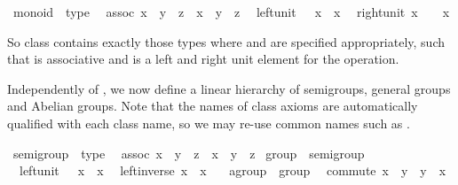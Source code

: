 \begin{isabellebody}
\begin{isamarkuptext}
\end{isamarkuptext}%
\isamarkuptrue%
\isamarkupfalse%
\ monoid\ {\isasymsubseteq}\ type\isanewline
\ \ assoc{\isacharcolon}\ {\isachardoublequoteopen}{\isacharparenleft}x\ {\isasymodot}\ y{\isacharparenright}\ {\isasymodot}\ z\ {\isacharequal}\ x\ {\isasymodot}\ {\isacharparenleft}y\ {\isasymodot}\ z{\isacharparenright}{\isachardoublequoteclose}\isanewline
\ \ left{\isacharunderscore}unit{\isacharcolon}\ {\isachardoublequoteopen}{\isasymone}\ {\isasymodot}\ x\ {\isacharequal}\ x{\isachardoublequoteclose}\isanewline
\ \ right{\isacharunderscore}unit{\isacharcolon}\ {\isachardoublequoteopen}x\ {\isasymodot}\ {\isasymone}\ {\isacharequal}\ x{\isachardoublequoteclose}%
\begin{isamarkuptext}%
\noindent So class  contains exactly those types
  \isa{{\isasymtau}} where \isa{{\isasymodot}\ {\isasymColon}\ {\isasymtau}\ {\isasymRightarrow}\ {\isasymtau}\ {\isasymRightarrow}\ {\isasymtau}} and \isa{{\isasymone}\ {\isasymColon}\ {\isasymtau}}
  are specified appropriately, such that \isa{{\isasymodot}} is associative and
  \isa{{\isasymone}} is a left and right unit element for the \isa{{\isasymodot}}
  operation.%
\end{isamarkuptext}%
\isamarkuptrue%
%
\begin{isamarkuptext}%
\medskip Independently of , we now define a linear
  hierarchy of semigroups, general groups and Abelian groups.  Note
  that the names of class axioms are automatically qualified with each
  class name, so we may re-use common names such as .%
\end{isamarkuptext}%
\isamarkuptrue%
\isamarkupfalse%
\ semigroup\ {\isasymsubseteq}\ type\isanewline
\ \ assoc{\isacharcolon}\ {\isachardoublequoteopen}{\isacharparenleft}x\ {\isasymodot}\ y{\isacharparenright}\ {\isasymodot}\ z\ {\isacharequal}\ x\ {\isasymodot}\ {\isacharparenleft}y\ {\isasymodot}\ z{\isacharparenright}{\isachardoublequoteclose}\isanewline
\isanewline
{}\isamarkupfalse%
\ group\ {\isasymsubseteq}\ semigroup\isanewline
\ \ left{\isacharunderscore}unit{\isacharcolon}\ {\isachardoublequoteopen}{\isasymone}\ {\isasymodot}\ x\ {\isacharequal}\ x{\isachardoublequoteclose}\isanewline
\ \ left{\isacharunderscore}inverse{\isacharcolon}\ {\isachardoublequoteopen}x{\isasyminv}\ {\isasymodot}\ x\ {\isacharequal}\ {\isasymone}{\isachardoublequoteclose}\isanewline
\isanewline
{}\isamarkupfalse%
\ agroup\ {\isasymsubseteq}\ group\isanewline
\ \ commute{\isacharcolon}\ {\isachardoublequoteopen}x\ {\isasymodot}\ y\ {\isacharequal}\ y\ {\isasymodot}\ x{\isachardoublequoteclose}%

\end{isabellebody}
